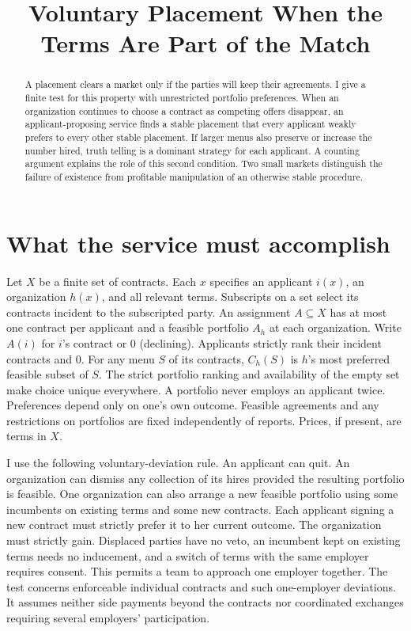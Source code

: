 \documentclass[11pt]{article}
\title{Voluntary Placement When the Terms Are Part of the Match}
\author{}
\date{}
\begin{document}
\maketitle
\begin{abstract}
A placement clears a market only if the parties will keep their agreements. I give a finite test for this property with unrestricted portfolio preferences. When an organization continues to choose a contract as competing offers disappear, an applicant-proposing service finds a stable placement that every applicant weakly prefers to every other stable placement. If larger menus also preserve or increase the number hired, truth telling is a dominant strategy for each applicant. A counting argument explains the role of this second condition. Two small markets distinguish the failure of existence from profitable manipulation of an otherwise stable procedure.
\end{abstract}

\section{What the service must accomplish}
Let $X$ be a finite set of contracts. Each $x$ specifies an applicant $i(x)$, an organization $h(x)$, and all relevant terms. Subscripts on a set select its contracts incident to the subscripted party. An assignment $A\subseteq X$ has at most one contract per applicant and a feasible portfolio $A_h$ at each organization. Write $A(i)$ for $i$'s contract or $0$ (declining). Applicants strictly rank their incident contracts and $0$. For any menu $S$ of its contracts, $C_h(S)$ is $h$'s most preferred feasible subset of $S$. The strict portfolio ranking and availability of the empty set make choice unique everywhere. A portfolio never employs an applicant twice. Preferences depend only on one's own outcome. Feasible agreements and any restrictions on portfolios are fixed independently of reports. Prices, if present, are terms in $X$.

I use the following voluntary-deviation rule. An applicant can quit. An organization can dismiss any collection of its hires provided the resulting portfolio is feasible. One organization can also arrange a new feasible portfolio using some incumbents on existing terms and some new contracts. Each applicant signing a new contract must strictly prefer it to her current outcome. The organization must strictly gain. Displaced parties have no veto, an incumbent kept on existing terms needs no inducement, and a switch of terms with the same employer requires consent. This permits a team to approach one employer together. The test concerns enforceable individual contracts and such one-employer deviations. It assumes neither side payments beyond the contracts nor coordinated exchanges requiring several employers' participation.
\end{document}

